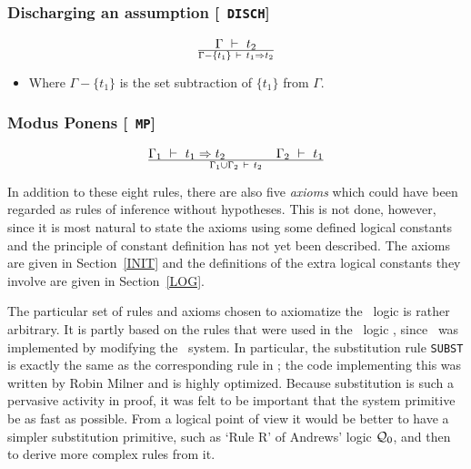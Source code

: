 \subsubsection*{Discharging an assumption [{\small\tt
DISCH}]}
\[
\Gamma\ \vdash\  t_2
\over
\Gamma -\{t_1\} \ \vdash\  t_1 \Rightarrow t_2
\]
\begin{itemize}
\item Where $\Gamma -\{t_1\}$ is the set subtraction of $\{t_1\}$
from $\Gamma$.
\end{itemize}

\subsubsection*{Modus Ponens [{\small\tt
MP}]}
\[
\Gamma_1 \ \vdash\  t_1 \Rightarrow t_2  \qquad\qquad   \Gamma_2\ \vdash\  t_1
\over
\Gamma_1 \cup \Gamma_2 \ \vdash\  t_2
\]

In addition to these eight rules, there are also five {\it
axioms\/} which could have been
regarded as rules of inference without hypotheses. This is not done,
however, since it is most natural to state the axioms using some
defined logical constants and the principle of constant definition has
not yet been described.  The axioms are given in Section~\ref{INIT} and
the definitions of the extra logical constants they involve are given in
Section~\ref{LOG}.

The particular set of rules and axioms chosen to axiomatize the \HOL\
logic is rather arbitrary. It is partly based on the rules that were
used in the
\LCF{}\ logic
\PPL{}, since \HOL\ was
implemented by modifying the \LCF\ system. In particular, the
substitution rule {\small\tt SUBST} is exactly
the same as the corresponding rule in \LCF; the code implementing this
was written by Robin Milner and is highly optimized. Because
substitution is such a pervasive activity in proof, it was felt to be
important that the system primitive be as fast as possible. From a
logical point of view it would be better to have a simpler
substitution primitive, such as `Rule R' of Andrews' logic ${\cal
Q}_0$, and then to derive more complex rules from it.


